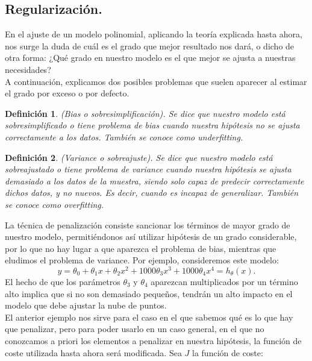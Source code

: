 \documentclass[a4paper,11pt]{article}
\newtheorem{definition}{Definición}
\begin{document}
\subsection{Regularización.}

En el ajuste de un modelo polinomial, aplicando la teoría explicada hasta ahora, nos surge la duda de cuál es el grado que mejor resultado nos dará, o dicho de otra forma: ¿Qué grado en nuestro modelo es el que mejor se ajusta a nuestras necesidades?\\

\noindent
A continuación, explicamos dos posibles problemas que suelen aparecer al estimar el grado por exceso o por defecto.\\
\begin{definition}(Bias o sobresimplificación). Se dice que nuestro modelo está
sobresimplificado o tiene problema de bias cuando nuestra hipótesis no se ajusta
correctamente a los datos. También se conoce como \textit{underfitting}.

\end{definition}
\begin{definition}(Variance o sobreajuste). Se dice que nuestro modelo está sobreajustado o tiene problema de variance cuando nuestra hipótesis se ajusta demasiado a los datos de la muestra, siendo solo capaz de predecir correctamente
dichos datos, y no nuevos. Es decir, cuando es incapaz de generalizar. También
se conoce como \textit{overfitting}.


\end{definition}
La técnica de penalización consiste sancionar los términos de mayor grado de nuestro modelo, permitiéndonos así utilizar hipótesis de un grado considerable, por lo que no hay lugar a que aparezca el problema de bias, mientras que eludimos el problema de variance. Por ejemplo, consideremos este modelo:
\[
 y=\theta_0+\theta_1 x+\theta_2 x^2+1000\theta_3 x^3+1000\theta_4 x^4 = h_\theta (x).
\]
El hecho de que los parámetros $\theta_3$ y $\theta_4$ aparezcan multiplicados por un término
alto implica que si no son demasiado pequeños, tendrán un alto impacto en el
modelo que debe ajustar la nube de puntos.\\

\noindent
El anterior ejemplo nos sirve para el caso en el que sabemos qué es lo que hay que penalizar, pero para poder usarlo en un caso general, en el que no conozcamos a priori los elementos a penalizar en nuestra hipótesis, la función de coste utilizada hasta ahora será modificada. Sea $J$ la función de coste:
\end{document}
